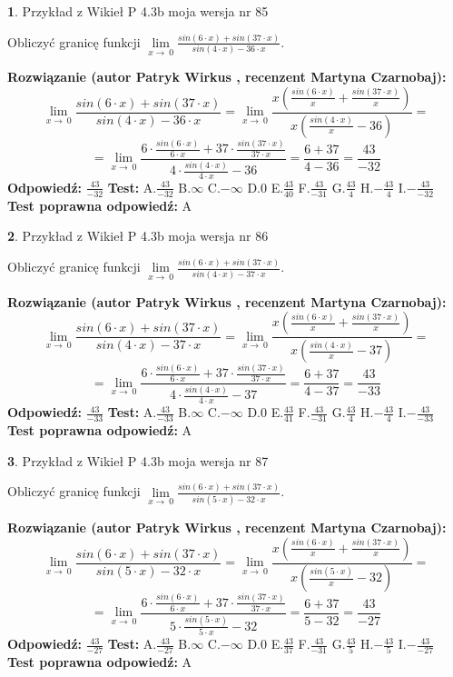 \documentclass[12pt, a4paper]{article}
\theoremstyle{definition} %
\newtheorem{zad}{}
\newcommand{\zadStart}[1]{\begin{zad}#1\newline}
\newcommand{\zadStop}{\end{zad}}
\newcommand{\rozwStart}[2]{\noindent \textbf{Rozwiązanie (autor #1 , recenzent #2): }\newline}
\newcommand{\rozwStop}{\newline}
\newcommand{\odpStart}{\noindent \textbf{Odpowiedź:}\newline}
\newcommand{\odpStop}{\newline}
\newcommand{\testStart}{\noindent \textbf{Test:}\newline}
\newcommand{\testStop}{\newline}
\newcommand{\kluczStart}{\noindent \textbf{Test poprawna odpowiedź:}\newline}
\newcommand{\kluczStop}{\newline}
\begin{document}
\zadStart{Przykład z Wikieł P 4.3b moja wersja nr 85}


Obliczyć granicę funkcji $\lim\limits_{x\to\ 0}\frac{sin(6 \cdot x)+sin(37 \cdot x)}{sin(4 \cdot x)-36 \cdot x}$.
\zadStop
\rozwStart{Patryk Wirkus}{Martyna Czarnobaj}
$$\lim\limits_{x\to\ 0}\frac{sin(6 \cdot x)+sin(37 \cdot x)}{sin(4 \cdot x)-36 \cdot x}=\lim\limits_{x\to\ 0}\frac{x(\frac{sin(6 \cdot x)}{x}+\frac{sin(37 \cdot x)}{x})}{x(\frac{sin(4 \cdot x)}{x}-36)}=$$
$$=\lim\limits_{x\to\ 0}\frac{6 \cdot \frac{sin(6 \cdot x)}{6 \cdot x}+37 \cdot \frac{sin(37 \cdot x)}{37 \cdot x}}{4 \cdot \frac{sin(4 \cdot x)}{4 \cdot x}-36}=\frac{6+37}{4-36} = \frac{43}{-32}$$
\rozwStop
\odpStart
$\frac{43}{-32}$
\odpStop
\testStart
A.$\frac{43}{-32}$
B.$\infty$
C.$-\infty$
D.$0$
E.$\frac{43}{40}$
F.$\frac{43}{-31}$
G.$\frac{43}{4}$
H.$-\frac{43}{4}$
I.$-\frac{43}{-32}$
\testStop
\kluczStart
A
\kluczStop



\zadStart{Przykład z Wikieł P 4.3b moja wersja nr 86}


Obliczyć granicę funkcji $\lim\limits_{x\to\ 0}\frac{sin(6 \cdot x)+sin(37 \cdot x)}{sin(4 \cdot x)-37 \cdot x}$.
\zadStop
\rozwStart{Patryk Wirkus}{Martyna Czarnobaj}
$$\lim\limits_{x\to\ 0}\frac{sin(6 \cdot x)+sin(37 \cdot x)}{sin(4 \cdot x)-37 \cdot x}=\lim\limits_{x\to\ 0}\frac{x(\frac{sin(6 \cdot x)}{x}+\frac{sin(37 \cdot x)}{x})}{x(\frac{sin(4 \cdot x)}{x}-37)}=$$
$$=\lim\limits_{x\to\ 0}\frac{6 \cdot \frac{sin(6 \cdot x)}{6 \cdot x}+37 \cdot \frac{sin(37 \cdot x)}{37 \cdot x}}{4 \cdot \frac{sin(4 \cdot x)}{4 \cdot x}-37}=\frac{6+37}{4-37} = \frac{43}{-33}$$
\rozwStop
\odpStart
$\frac{43}{-33}$
\odpStop
\testStart
A.$\frac{43}{-33}$
B.$\infty$
C.$-\infty$
D.$0$
E.$\frac{43}{41}$
F.$\frac{43}{-31}$
G.$\frac{43}{4}$
H.$-\frac{43}{4}$
I.$-\frac{43}{-33}$
\testStop
\kluczStart
A
\kluczStop



\zadStart{Przykład z Wikieł P 4.3b moja wersja nr 87}


Obliczyć granicę funkcji $\lim\limits_{x\to\ 0}\frac{sin(6 \cdot x)+sin(37 \cdot x)}{sin(5 \cdot x)-32 \cdot x}$.
\zadStop
\rozwStart{Patryk Wirkus}{Martyna Czarnobaj}
$$\lim\limits_{x\to\ 0}\frac{sin(6 \cdot x)+sin(37 \cdot x)}{sin(5 \cdot x)-32 \cdot x}=\lim\limits_{x\to\ 0}\frac{x(\frac{sin(6 \cdot x)}{x}+\frac{sin(37 \cdot x)}{x})}{x(\frac{sin(5 \cdot x)}{x}-32)}=$$
$$=\lim\limits_{x\to\ 0}\frac{6 \cdot \frac{sin(6 \cdot x)}{6 \cdot x}+37 \cdot \frac{sin(37 \cdot x)}{37 \cdot x}}{5 \cdot \frac{sin(5 \cdot x)}{5 \cdot x}-32}=\frac{6+37}{5-32} = \frac{43}{-27}$$
\rozwStop
\odpStart
$\frac{43}{-27}$
\odpStop
\testStart
A.$\frac{43}{-27}$
B.$\infty$
C.$-\infty$
D.$0$
E.$\frac{43}{37}$
F.$\frac{43}{-31}$
G.$\frac{43}{5}$
H.$-\frac{43}{5}$
I.$-\frac{43}{-27}$
\testStop
\kluczStart
A
\kluczStop
\end{document}
